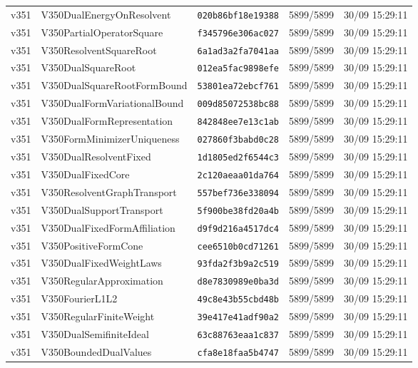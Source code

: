 \documentclass[11pt]{article}
\theoremstyle{definition}\newtheorem{deriv}{Derivação}
\begin{document}
{\begin{longtable}{@{}lllll@{}}
v351 & V350DualEnergyOnResolvent & \texttt{020b86bf18e19388} & 5899/5899 & 30/09 15:29:11 \\
v351 & V350PartialOperatorSquare & \texttt{f345796e306ac027} & 5899/5899 & 30/09 15:29:11 \\
v351 & V350ResolventSquareRoot & \texttt{6a1ad3a2fa7041aa} & 5899/5899 & 30/09 15:29:11 \\
v351 & V350DualSquareRoot & \texttt{012ea5fac9898efe} & 5899/5899 & 30/09 15:29:11 \\
v351 & V350DualSquareRootFormBound & \texttt{53801ea72ebcf761} & 5899/5899 & 30/09 15:29:11 \\
v351 & V350DualFormVariationalBound & \texttt{009d85072538bc88} & 5899/5899 & 30/09 15:29:11 \\
v351 & V350DualFormRepresentation & \texttt{842848ee7e13c1ab} & 5899/5899 & 30/09 15:29:11 \\
v351 & V350FormMinimizerUniqueness & \texttt{027860f3babd0c28} & 5899/5899 & 30/09 15:29:11 \\
v351 & V350DualResolventFixed & \texttt{1d1805ed2f6544c3} & 5899/5899 & 30/09 15:29:11 \\
v351 & V350DualFixedCore & \texttt{2c120aeaa01da764} & 5899/5899 & 30/09 15:29:11 \\
v351 & V350ResolventGraphTransport & \texttt{557bef736e338094} & 5899/5899 & 30/09 15:29:11 \\
v351 & V350DualSupportTransport & \texttt{5f900be38fd20a4b} & 5899/5899 & 30/09 15:29:11 \\
v351 & V350DualFixedFormAffiliation & \texttt{d9f9d216a4517dc4} & 5899/5899 & 30/09 15:29:11 \\
v351 & V350PositiveFormCone & \texttt{cee6510b0cd71261} & 5899/5899 & 30/09 15:29:11 \\
v351 & V350DualFixedWeightLaws & \texttt{93fda2f3b9a2c519} & 5899/5899 & 30/09 15:29:11 \\
v351 & V350RegularApproximation & \texttt{d8e7830989e0ba3d} & 5899/5899 & 30/09 15:29:11 \\
v351 & V350FourierL1L2 & \texttt{49c8e43b55cbd48b} & 5899/5899 & 30/09 15:29:11 \\
v351 & V350RegularFiniteWeight & \texttt{39e417e41adf90a2} & 5899/5899 & 30/09 15:29:11 \\
v351 & V350DualSemifiniteIdeal & \texttt{63c88763eaa1c837} & 5899/5899 & 30/09 15:29:11 \\
v351 & V350BoundedDualValues & \texttt{cfa8e18faa5b4747} & 5899/5899 & 30/09 15:29:11 \\

\end{longtable}}
\end{document}
